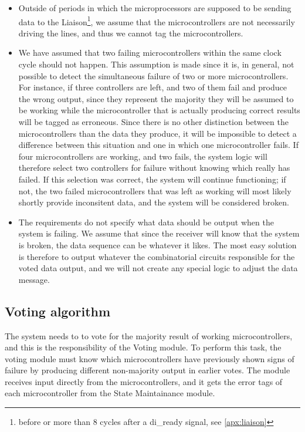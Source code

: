 \begin{itemize}
\item Outside of periods in which the microprocessors are supposed to
  be sending data to the Liaison\footnote{before or more than 8 cycles
    after a {\ttfamily di\_ready} signal, see \autoref{apx:liaison}},
  we assume that the microcontrollers are not necessarily driving the
  lines, and thus we cannot tag the microcontrollers.

\item We have assumed that two failing microcontrollers within the
  same clock cycle should not happen. This assumption is made since it
  is, in general, not possible to detect the simultaneous failure of
  two or more microcontrollers. For instance, if three controllers are
  left, and two of them fail and produce the wrong output, since they
  represent the majority they will be assumed to be working while the
  microcontroller that is actually producing correct results will be
  tagged as erroneous. Since there is no other distinction between the
  microcontrollers than the data they produce, it will be impossible
  to detect a difference between this situation and one in which one
  microcontroller fails. If four microcontrollers are working, and two
  fails, the system logic will therefore select two controllers for
  failure without knowing which really has failed. If this selection
  was correct, the system will continue functioning; if not, the two
  failed microcontrollers that was left as working will most likely
  shortly provide inconsitent data, and the system will be considered
  broken.

\item The requirements do not specify what data should be output when
  the system is failing. We assume that since the receiver will know
  that the system is broken, the data sequence can be whatever it
  likes. The most easy solution is therefore to output whatever the
  combinatorial circuits responsible for the voted data output, and we
  will not create any special logic to adjust the data message.

\end{itemize}


\subsection{Voting algorithm}
\label{sec:votingalgorithm}
The system needs to to vote for the majority result of working
microcontrollers, and this is the responsibility of the Voting
module. To perform this task, the voting module must know which
microcontrollers have previously shown signs of failure by producing
different non-majority output in earlier votes. The module receives
input directly from the microcontrollers, and it gets the error tags
of each microcontroller from the State Maintainance module.

